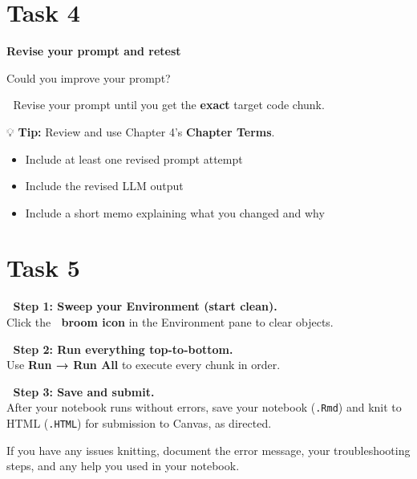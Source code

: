 \documentclass[
  12pt,
]{scrreprt}
\begin{document}
\section{Task 4}\label{task-4}

\textbf{Revise your prompt and retest}

Could you improve your prompt?

🎯 Revise your prompt until you get the \textbf{exact} target code
chunk.

💡 \textbf{Tip:} Review and use Chapter 4's \textbf{Chapter Terms}.

\begin{itemize}
\item
  Include at least one revised prompt attempt
\item
  Include the revised LLM output
\item
  Include a short memo explaining what you changed and why
\end{itemize}

\section{Task 5}\label{task-5}

🎯 \textbf{Step 1: Sweep your Environment (start clean).}\\
Click the 🧹 \textbf{broom icon} in the Environment pane to clear
objects.

🎯 \textbf{Step 2: Run everything top-to-bottom.}\\
Use \textbf{Run → Run All} to execute every chunk in order.

🎯 \textbf{Step 3: Save and submit.}\\
After your notebook runs without errors, save your notebook
(\texttt{.Rmd}) and knit to HTML (\texttt{.HTML}) for submission to
Canvas, as directed.

If you have any issues knitting, document the error message, your
troubleshooting steps, and any help you used in your notebook.


\end{document}

